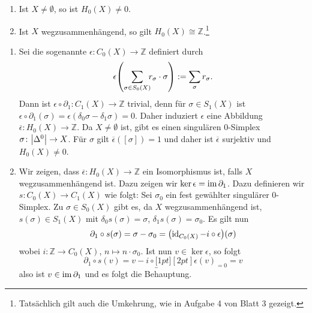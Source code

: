 \begin{proposition}[{name=[{Eigenschaften von $H_0(X)$ für $X \not= \emptyset$ und $X$ wegzusammenhängend}]}]
	\leavevmode\begin{enumerate}[1),itemsep=0pt]
		\item Ist $X \not= \emptyset$, so ist $H_0(X) \not=0$.
		\item Ist $X$ wegzusammenhängend, so gilt $H_0(X) \cong \mathbb{Z}$.\footnote{Tatsächlich gilt auch die Umkehrung, wie in Aufgabe 4 von Blatt 3 gezeigt.}
	\end{enumerate}
\end{proposition}
\begin{beweis}
	\begin{enumerate}[1)]
		\item Sei die sogenannte  $\epsilon \colon C_0(X) \to \mathbb{Z}$ definiert durch 
		\[
			\epsilon \enbrace*{\sum_{\sigma \in S_0(X)} \hspace{-1ex} r_\sigma \cdot \sigma } := \sum_\sigma r_\sigma.
		\]
		Dann ist $\epsilon \circ \partial_1 \colon C_1(X) \to \mathbb{Z}$ trivial, denn für $\sigma \in S_1(X)$ ist $\epsilon \circ \partial_1(\sigma)= \epsilon(\delta_0 \sigma - \delta_1 \sigma) = 0$.
		Daher induziert $\epsilon$ eine Abbildung $\overline{\epsilon} \colon H_0(X) \to \mathbb{Z}$. 
		Da $X \not= \emptyset$ ist, gibt es einen singulären $0$-Simplex $\sigma \colon \abs*{\Delta^0} \to X$. 
		Für $\sigma$ gilt $\overline{\epsilon}( [\sigma])=1$ und daher ist $\overline{\epsilon}$ surjektiv und $H_0(X) \not= 0$.
		\item Wir zeigen, dass $\overline{\epsilon} \colon H_0(X) \to \mathbb{Z}$ ein Isomorphismus ist, falls $X$ wegzusammenhängend ist. 
		Dazu zeigen wir $\ker \epsilon = \operatorname{im} \partial_1$. 
		Dazu definieren wir $s \colon C_0(X) \to C_1(X)$ wie folgt: Sei $\sigma_0$ ein fest gewählter singulärer $0$-Simplex.
		Zu $\sigma \in S_0(X)$ gibt es, da $X$ wegzusammenhängend ist, $s(\sigma) \in S_1(X)$ mit $\delta_0 s(\sigma)= \sigma$, $\delta_1 s(\sigma)= \sigma_0$.
		Es gilt nun 
		\begin{align*}
			\partial_1 \circ s(\sigma) = \sigma - \sigma_0 = \enbrace*{\id_{C_0(X)} - i \circ \epsilon }(\sigma)
		\end{align*}
		wobei $i \colon \mathbb{Z} \to C_0(X)$, $n \mapsto n \cdot \sigma_0$. 
		Ist nun $v \in \ker \epsilon$, so folgt 
		\[
			\partial_1 \circ s(v)= v- i \circ \underbracket[1pt][2pt]{\epsilon(v)}_{=0} = v
		\]
		also ist $v \in \operatorname{im} \partial_1$ und es folgt die Behauptung. \qedhere
	\end{enumerate}
\end{beweis}

